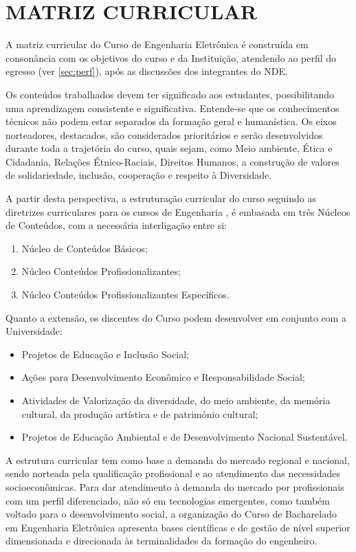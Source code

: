 \section{MATRIZ CURRICULAR}
\label{sec:matriz}

A matriz curricular do Curso de Engenharia Eletrônica é construída em consonância com os objetivos do curso e da Instituição, atendendo ao perfil do egresso (ver \autoref{sec:perf}), após as discussões dos integrantes do NDE.

Os conteúdos trabalhados devem ter significado aos estudantes, possibilitando uma aprendizagem consistente e significativa. Entende-se que os conhecimentos técnicos não podem estar separados da formação geral e humanística. Os eixos norteadores, destacados, são considerados prioritários e serão desenvolvidos durante toda a trajetória do curso, quais sejam, como Meio ambiente, Ética e Cidadania, Relações Étnico-Raciais, Direitos Humanos, a construção de valores de solidariedade, inclusão, cooperação e respeito à Diversidade.

A partir desta perspectiva, a estruturação curricular do curso seguindo as diretrizes curriculares para os cursos de Engenharia \cite{dcneng}, é embasada em três Núcleos de Conteúdos, com a necessária interligação entre si:

\begin{enumerate}
	\item 	Núcleo de Conteúdos Básicos;
	\item 	Núcleo Conteúdos Profissionalizantes;
	\item 	Núcleo Conteúdos Profissionalizantes Específicos.
\end{enumerate}

Quanto a extensão, os discentes do Curso podem desenvolver em conjunto com a Universidade:

\begin{itemize}
	\item 	Projetos de Educação e Inclusão Social;
	\item	Ações para Desenvolvimento Econômico e Responsabilidade Social;
	\item	Atividades de Valorização da diversidade, do meio ambiente, da memória cultural, da produção artística e de patrimônio cultural;
	\item	Projetos de Educação Ambiental e de Desenvolvimento Nacional Sustentável.
\end{itemize}

A estrutura curricular tem como base a demanda do mercado regional e nacional, sendo norteada pela qualificação profissional e ao atendimento das necessidades socioeconômicas. Para dar atendimento à demanda do mercado por profissionais com um perfil diferenciado, não só em tecnologias emergentes, como também voltado para o desenvolvimento social, a organização do Curso de Bacharelado em Engenharia Eletrônica apresenta bases científicas e de gestão de nível superior dimensionada e direcionada às terminalidades da formação do engenheiro. %

